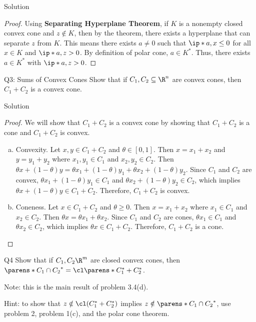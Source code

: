 \documentclass{article}
\theoremstyle{plain}
\theoremstyle{definition}
\theoremstyle{remark}
\begin{document}
\begin{solution}
    {Solution}
    \begin{proof}
        Using \textbf{Separating Hyperplane Theorem}, if $K$ is a nonempty closed convex cone and $z\notin K$, then by the theorem, there exists a hyperplane that can separate $z$ from $K$. This means there exists $a\neq 0$ such that $\ip*{a, x}\leq 0$ for all $x\in K$ and $\ip*{a, z}>0$. By definition of polar cone, $a\in K^*$. Thus, there exists $a\in K^*$ with $\ip*{a,z}>0$.
    \end{proof}
\end{solution}

\begin{problem}
    {Q3: Sums of Convex Cones}
    Show that if $C_1, C_2\subseteq \R^n$ are convex cones, then $C_1+C_2$ is a convex cone.
\end{problem}

\begin{solution}
    {Solution}
    \begin{proof}
    We will show that $C_1+C_2$ is a convex cone by showing that $C_1+C_2$ is a cone and $C_1+C_2$ is convex.
    \begin{enumerate}[(a)]
        \item Convexity. {
                Let $x,y\in C_1+C_2$ and $\theta\in[0,1]$. Then $x=x_1+x_2$ and $y=y_1+y_2$ where $x_1,y_1\in C_1$ and $x_2,y_2\in C_2$. Then $\theta x+(1-\theta)y=\theta x_1+(1-\theta)y_1+\theta x_2+(1-\theta)y_2$. Since $C_1$ and $C_2$ are convex, $\theta x_1+(1-\theta)y_1\in C_1$ and $\theta x_2+(1-\theta)y_2\in C_2$, which implies $\theta x+(1-\theta)y\in C_1+C_2$. Therefore, $C_1+C_2$ is convex.
        }
        \item Coneness. {
                Let $x\in C_1+C_2$ and $\theta\geq 0$. Then $x=x_1+x_2$ where $x_1\in C_1$ and $x_2\in C_2$. Then $\theta x=\theta x_1+\theta x_2$. Since $C_1$ and $C_2$ are cones, $\theta x_1\in C_1$ and $\theta x_2\in C_2$, which implies $\theta x\in C_1+C_2$. Therefore, $C_1+C_2$ is a cone.
        }
    \end{enumerate}
\end{proof}
\end{solution}

\begin{problem}
    {Q4}
    Show that if $C_1, C_2 \R^m$ are closed convex cones, then $\parens*{C_1\cap C_2}^*=\cl \parens*{C_1^*+C_2^*}$.

    Note: this is the main result of problem 3.4(d).

    Hint: to show that $z\notin\cl(C_1^*+C_2^*)$ implies $z\notin \parens*{C_1\cap C_2}^*$, use problem 2, problem 1(c), and the polar cone theorem.
\end{problem}
\end{document}
